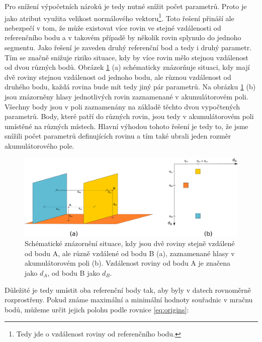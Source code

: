 \documentclass[11pt,twoside,a4paper]{book}
\begin{document}
Pro snížení výpočetních nároků je tedy nutné snížit počet parametrů. Proto je jako atribut využita velikost normálového vektoru\footnote{Tedy jde o vzdálenost roviny od referenčního bodu.}. Toto řešení přináší ale nebezpečí v tom, že může existovat více rovin ve stejné vzdálenosti od referenčního bodu a v takovém případě by několik rovin splynulo do jednoho segmentu. Jako řešení je zaveden druhý referenční bod a tedy i druhý parametr. Tím se značně snižuje riziko situace, kdy by více rovin mělo stejnou vzdálenost od dvou různých bodů. Obrázek \ref{fig:normal-def} (a) schématicky znázorňuje situaci, kdy mají dvě roviny stejnou vzdálenost od jednoho bodu, ale různou vzdálenost od druhého bodu, každá rovina bude mít tedy jiný pár parametrů. Na obrázku \ref{fig:normal-def} (b) jsou znázorněny hlasy jednotlivých rovin zaznamenané v akumulátorovém poli. Všechny body jsou v poli zaznamenány na základě těchto dvou vypočtených parametrů. Body, které patří do různých rovin, jsou tedy v akumulátorovém poli umístěné na různých místech. Hlavní výhodou tohoto řešení je tedy to, že jsme snížili počet parametrů definujících rovinu a tím také ubrali jeden rozměr akumulátorového pole.

\begin{figure}[ht]
\begin{center}
\includegraphics[width=\textwidth]{figures/definice-normal}
\caption{Schématické znázornění situace, kdy jsou dvě roviny stejně vzdálené od bodu A, ale různě vzdálené od bodu B (a), zaznamenané hlasy v akumulátorovém poli (b). Vzdálenost roviny od bodu A je značena jako $d_A$, od bodu B jako $d_B.$}
\label{fig:normal-def}
\end{center}
\end{figure}

Důležité je tedy umístit oba referenční body tak, aby byly v datech rovnoměrně rozprostřeny. Pokud známe maximální a minimální hodnoty souřadnic v mračnu bodů, můžeme určit jejich polohu podle rovnice \ref{eq:origins}:
\end{document}
